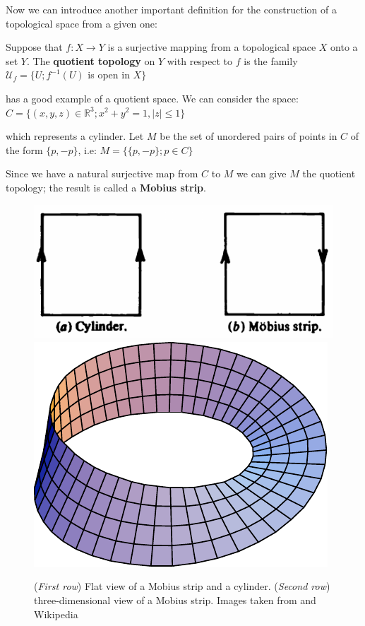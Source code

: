 Now we can introduce another important definition for the construction of a topological space from a given one:

\begin{definition}
 Suppose that $f \colon X \rightarrow Y$ is a surjective mapping from a topological space $X$ onto a set $Y$. The \textbf{quotient topology} on $Y$ with respect to $f$ is the family $\mathcal{U}_{f} = \{ U; f^{-1}(U)$ is open in $X \}$
\end{definition}

\cite{Kosniowski} has a good example of a quotient space. We can consider the space:
\begin{math}
 C = \{ (x,y,z) \in \mathbb{R}^{3}; x^{2} + y^{2} = 1, |z| \leq 1 \}
\end{math}

which represents a cylinder. Let $M$ be the set of unordered pairs of points in $C$ of the form $\{p,-p\}$, i.e:
\begin{math}
 M = \{ \{p,-p\}; p \in C \}
\end{math}

Since we have a natural surjective map from $C$ to $M$ we can give $M$ the quotient topology; the result is called a \textbf{Mobius strip}.

\begin{figure}[htb] %
   \centering
   \includegraphics[width=0.65\linewidth]{images/mobiusStripCylinder.png}\\
   \includegraphics[width=0.35\linewidth]{images/MobiusStrip.pdf}
   \caption[Relationship between Mobius strip and a cylinder]{(\textit{First row}) Flat view of a Mobius strip and a cylinder. (\textit{Second row}) three-dimensional view of a Mobius strip. Images taken from \cite{Kosniowski} and Wikipedia}
   \label{fig:MobiusCylinder}
\end{figure}

